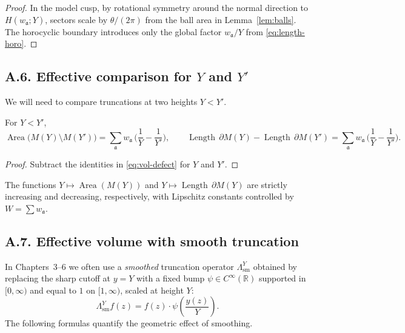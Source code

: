 \begin{proof}
In the model cusp, by rotational symmetry around the normal direction to
$H(w_{\mathfrak a};Y)$, sectors scale by $\theta/(2\pi)$ from the ball area in
Lemma~\ref{lem:balls}. The horocyclic boundary introduces only the global
factor $w_{\mathfrak a}/Y$ from \eqref{eq:length-horo}.
\end{proof}

\subsection*{A.6. Effective comparison for $Y$ and $Y'$}

\noindent
We will need to compare truncations at two heights $Y<Y'$.

\begin{lemma}\label{lem:Y-compare}
For $Y<Y'$,
\[
\operatorname{Area}\big(M(Y)\setminus M(Y')\big)= \sum_{\mathfrak a} w_{\mathfrak a}\,\Big(\frac{1}{Y}-\frac{1}{Y'}\Big),
\qquad
\operatorname{Length}\,\partial M(Y) - \operatorname{Length}\,\partial M(Y')= \sum_{\mathfrak a} w_{\mathfrak a}\,\Big(\frac{1}{Y}-\frac{1}{Y'}\Big).
\]
\end{lemma}

\begin{proof}
Subtract the identities in \eqref{eq:vol-defect} for $Y$ and $Y'$.
\end{proof}

\begin{corollary}\label{cor:monotone}
The functions $Y\mapsto \operatorname{Area}(M(Y))$ and
$Y\mapsto \operatorname{Length}\,\partial M(Y)$ are strictly increasing and
decreasing, respectively, with Lipschitz constants controlled by $W=\sum w_{\mathfrak a}$.
\end{corollary}


\subsection*{A.7. Effective volume with smooth truncation}

\noindent
In Chapters~3–6 we often use a \emph{smoothed} truncation operator $\Lambda^Y_{\mathrm{sm}}$
obtained by replacing the sharp cutoff at $y=Y$ with a fixed bump
$\psi\in C^\infty(\mathbb R)$ supported in $[0,\infty)$ and equal to $1$ on
$[1,\infty)$, scaled at height $Y$:
\[
\Lambda^Y_{\mathrm{sm}} f(z)= f(z)\cdot \psi\!\left(\frac{y(z)}{Y}\right).
\]
The following formulas quantify the geometric effect of smoothing.

